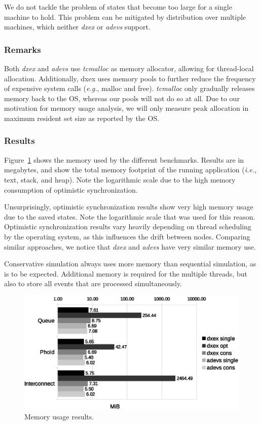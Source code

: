 We do not tackle the problem of states that become too large for a single machine to hold.
This problem can be mitigated by distribution over multiple machines, which neither \textit{dxex} or \textit{adevs} support.

\subsubsection{Remarks}
Both \textit{dxex} and \textit{adevs} use \textit{tcmalloc} as memory allocator, allowing for thread-local allocation.
Additionally, dxex uses memory pools to further reduce the frequency of expensive system calls (\textit{e.g.}, malloc and free).
\textit{tcmalloc} only gradually releases memory back to the OS, whereas our pools will not do so at all.
Due to our motivation for memory usage analysis, we will only measure peak allocation in maximum resident set size as reported by the OS.

\subsubsection{Results}
Figure~\ref{fig:memory} shows the memory used by the different benchmarks.
Results are in megabytes, and show the total memory footprint of the running application (\textit{i.e.}, text, stack, and heap).
Note the logarithmic scale due to the high memory consumption of optimistic synchronization.

Unsurprisingly, optimistic synchronization results show very high memory usage due to the saved states.
Note the logarithmic scale that was used for this reason.
Optimistic synchronization results vary heavily depending on thread scheduling by the operating system, as this influences the drift between nodes. 
Comparing similar approaches, we notice that \textit{dxex} and \textit{adevs} have very similar memory use.

Conservative simulation always uses more memory than sequential simulation, as is to be expected.
Additional memory is required for the multiple threads, but also to store all events that are processed simultaneously.

\begin{figure}
    \includegraphics[width=\columnwidth]{fig/memory_voorlopig.eps}
    \caption{Memory usage results.}
    \label{fig:memory}
\end{figure}

